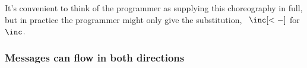 \documentclass[
  class=../hdeyoung-proposal,
  crop=false
]{standalone}
\begin{document}
%
%
%
It's convenient to think of the programmer as supplying this choreography in full, but in practice the programmer might only give the substitution, \eg\ $\inc[<-]$ for $\inc$.

\subsubsection{Messages can flow in both directions}\label{sec:chor-binary-count}
\end{document}
